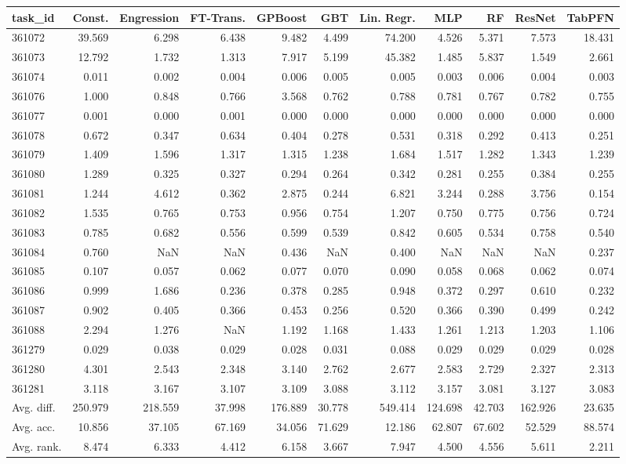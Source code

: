 \begin{tabular}{lrrrrrrrrrr}
\toprule
task\_id & Const. & Engression & FT-Trans. & GPBoost & GBT & Lin. Regr. & MLP & RF & ResNet & TabPFN \\
\midrule
361072 & 39.569 & 6.298 & 6.438 & 9.482 & 4.499 & 74.200 & 4.526 & 5.371 & 7.573 & 18.431 \\
361073 & 12.792 & 1.732 & 1.313 & 7.917 & 5.199 & 45.382 & 1.485 & 5.837 & 1.549 & 2.661 \\
361074 & 0.011 & 0.002 & 0.004 & 0.006 & 0.005 & 0.005 & 0.003 & 0.006 & 0.004 & 0.003 \\
361076 & 1.000 & 0.848 & 0.766 & 3.568 & 0.762 & 0.788 & 0.781 & 0.767 & 0.782 & 0.755 \\
361077 & 0.001 & 0.000 & 0.001 & 0.000 & 0.000 & 0.000 & 0.000 & 0.000 & 0.000 & 0.000 \\
361078 & 0.672 & 0.347 & 0.634 & 0.404 & 0.278 & 0.531 & 0.318 & 0.292 & 0.413 & 0.251 \\
361079 & 1.409 & 1.596 & 1.317 & 1.315 & 1.238 & 1.684 & 1.517 & 1.282 & 1.343 & 1.239 \\
361080 & 1.289 & 0.325 & 0.327 & 0.294 & 0.264 & 0.342 & 0.281 & 0.255 & 0.384 & 0.255 \\
361081 & 1.244 & 4.612 & 0.362 & 2.875 & 0.244 & 6.821 & 3.244 & 0.288 & 3.756 & 0.154 \\
361082 & 1.535 & 0.765 & 0.753 & 0.956 & 0.754 & 1.207 & 0.750 & 0.775 & 0.756 & 0.724 \\
361083 & 0.785 & 0.682 & 0.556 & 0.599 & 0.539 & 0.842 & 0.605 & 0.534 & 0.758 & 0.540 \\
361084 & 0.760 & NaN & NaN & 0.436 & NaN & 0.400 & NaN & NaN & NaN & 0.237 \\
361085 & 0.107 & 0.057 & 0.062 & 0.077 & 0.070 & 0.090 & 0.058 & 0.068 & 0.062 & 0.074 \\
361086 & 0.999 & 1.686 & 0.236 & 0.378 & 0.285 & 0.948 & 0.372 & 0.297 & 0.610 & 0.232 \\
361087 & 0.902 & 0.405 & 0.366 & 0.453 & 0.256 & 0.520 & 0.366 & 0.390 & 0.499 & 0.242 \\
361088 & 2.294 & 1.276 & NaN & 1.192 & 1.168 & 1.433 & 1.261 & 1.213 & 1.203 & 1.106 \\
361279 & 0.029 & 0.038 & 0.029 & 0.028 & 0.031 & 0.088 & 0.029 & 0.029 & 0.029 & 0.028 \\
361280 & 4.301 & 2.543 & 2.348 & 3.140 & 2.762 & 2.677 & 2.583 & 2.729 & 2.327 & 2.313 \\
361281 & 3.118 & 3.167 & 3.107 & 3.109 & 3.088 & 3.112 & 3.157 & 3.081 & 3.127 & 3.083 \\
Avg. diff. & 250.979 & 218.559 & 37.998 & 176.889 & 30.778 & 549.414 & 124.698 & 42.703 & 162.926 & 23.635 \\
Avg. acc. & 10.856 & 37.105 & 67.169 & 34.056 & 71.629 & 12.186 & 62.807 & 67.602 & 52.529 & 88.574 \\
Avg. rank. & 8.474 & 6.333 & 4.412 & 6.158 & 3.667 & 7.947 & 4.500 & 4.556 & 5.611 & 2.211 \\
\bottomrule
\end{tabular}
